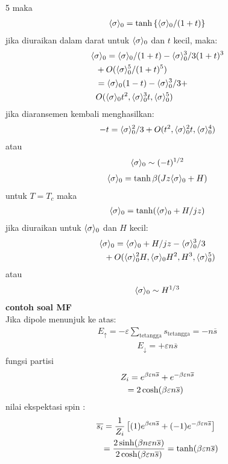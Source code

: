 \documentclass[a4paper  , 6 pt]{article}
\begin{document}
\begin{tiny}
\begin{multicols} {5}
maka
\begin{align}
\langle \sigma \rangle_0  = \tanh \left \{ \langle \sigma \rangle_0 / (1 + t) \right \}
\end{align}
jika diuraikan dalam darat untuk $\langle \sigma \rangle_0$ dan $t$ kecil, maka:
\begin{align}
& \langle \sigma \rangle_0 =  \langle \sigma \rangle_0 /(1 +t)  - \langle \sigma \rangle_0^3 /3 (1+t)^3   \nonumber \\ 
& \hspace{ 0.2 cm} +  O(\langle \sigma \rangle_0^5 /(1 + t)^5 ) \nonumber \\ 
& \hspace{ 0.2 cm} = \langle \sigma \rangle_0 (1- t)  - \langle \sigma \rangle_0^3 /3 + \nonumber \\ 
& \hspace{ 0.2 cm}  O (\langle \sigma \rangle_0 t^2, \langle \sigma \rangle_0^3 t, \langle \sigma \rangle_0^5 )
\end{align}
jika diaransemen kembali menghasilkan:
\begin{align}
- t = \langle \sigma \rangle_0^2 /3 + O(t^2 , \langle \sigma \rangle_0^2 t , \langle \sigma \rangle_0^4 )
\end{align}
atau
\begin{align}
\langle \sigma \rangle_0 \sim (-t)^{1/2 }
\end{align}
\begin{align}
\langle \sigma \rangle_0 = \tanh \beta  (J z \langle \sigma \rangle_0  + H) 
\end{align}
untuk $T = T_c $ maka 
\begin{align}
\langle \sigma \rangle_0 = \tanh (\langle \sigma \rangle_0 + H/ jz ) 
\end{align}
jika diuraikan untuk $\langle \sigma \rangle_0$ dan $H$ kecil:
\begin{align}
& \langle \sigma \rangle_0  = \langle \sigma \rangle_0 + H /jz  - \langle \sigma \rangle_0^3/ 3  \nonumber \\ 
& \hspace{ 0.2 cm} +  O (\langle \sigma \rangle_0^2 H, \langle \sigma \rangle_0 H^2 , H^3 , \langle \sigma \rangle_0^5 )
\end{align} 
atau 
\begin{align}
\langle \sigma \rangle_0 \sim H^{1/3}
\end{align}
\textbf{contoh soal MF}\\
Jika dipole menunjuk ke atas: 
\begin{align}
E_\uparrow  = - \varepsilon \sum_{\text{tetangga}} s_\text{tetangga}  = - n \overline{s} 
\end{align}
\begin{align}
E_\downarrow = + \varepsilon  n \overline{s}
\end{align}
fungsi partisi 
\begin{align}
& Z_i  = e^{\beta \varepsilon  n \overline{s}} + e^{- \beta \varepsilon n \overline{s}} \nonumber \\ 
& \hspace{ 0.2 cm}  = 2 \cosh (\beta  \varepsilon n \overline{s})   
\end{align}
nilai ekspektasi spin :
\begin{align}
&\overline{s_i } = \frac{1}{Z_i } \left[  (1)e^{\beta \epsilon n \overline{s}} + (-1) e^{-\beta \varepsilon n \overline{s}}\right ] \pindah 
\spasi =  \frac{2 \sinh (\beta n \varepsilon n \overline{s})}{2 \cosh 
 (\beta \varepsilon n \overline{s})} =\tanh (\beta \varepsilon n \overline{s})

\end{align}
\end{multicols}
\end{tiny}
\end{document}
